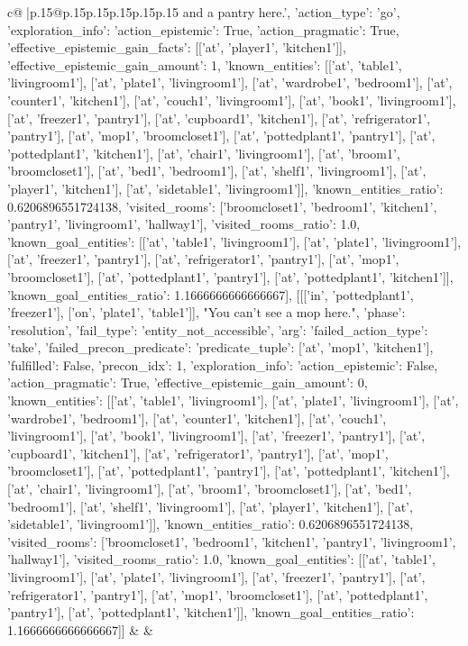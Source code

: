 \documentclass{article}
\begin{document}
{\begin{supertabular}{c@{$\;$}|p{.15\linewidth}@{}p{.15\linewidth}p{.15\linewidth}p{.15\linewidth}p{.15\linewidth}p{.15\linewidth}}
{{{and a pantry here.', {'action_type': 'go', 'exploration_info': {'action_epistemic': True, 'action_pragmatic': True, 'effective_epistemic_gain_facts': [['at', 'player1', 'kitchen1']], 'effective_epistemic_gain_amount': 1, 'known_entities': [['at', 'table1', 'livingroom1'], ['at', 'plate1', 'livingroom1'], ['at', 'wardrobe1', 'bedroom1'], ['at', 'counter1', 'kitchen1'], ['at', 'couch1', 'livingroom1'], ['at', 'book1', 'livingroom1'], ['at', 'freezer1', 'pantry1'], ['at', 'cupboard1', 'kitchen1'], ['at', 'refrigerator1', 'pantry1'], ['at', 'mop1', 'broomcloset1'], ['at', 'pottedplant1', 'pantry1'], ['at', 'pottedplant1', 'kitchen1'], ['at', 'chair1', 'livingroom1'], ['at', 'broom1', 'broomcloset1'], ['at', 'bed1', 'bedroom1'], ['at', 'shelf1', 'livingroom1'], ['at', 'player1', 'kitchen1'], ['at', 'sidetable1', 'livingroom1']], 'known_entities_ratio': 0.6206896551724138, 'visited_rooms': ['broomcloset1', 'bedroom1', 'kitchen1', 'pantry1', 'livingroom1', 'hallway1'], 'visited_rooms_ratio': 1.0, 'known_goal_entities': [['at', 'table1', 'livingroom1'], ['at', 'plate1', 'livingroom1'], ['at', 'freezer1', 'pantry1'], ['at', 'refrigerator1', 'pantry1'], ['at', 'mop1', 'broomcloset1'], ['at', 'pottedplant1', 'pantry1'], ['at', 'pottedplant1', 'kitchen1']], 'known_goal_entities_ratio': 1.1666666666666667}}], [[['in', 'pottedplant1', 'freezer1'], ['on', 'plate1', 'table1']], "You can't see a mop here.", {'phase': 'resolution', 'fail_type': 'entity_not_accessible', 'arg': {'failed_action_type': 'take', 'failed_precon_predicate': {'predicate_tuple': ['at', 'mop1', 'kitchen1'], 'fulfilled': False, 'precon_idx': 1}}, 'exploration_info': {'action_epistemic': False, 'action_pragmatic': True, 'effective_epistemic_gain_amount': 0, 'known_entities': [['at', 'table1', 'livingroom1'], ['at', 'plate1', 'livingroom1'], ['at', 'wardrobe1', 'bedroom1'], ['at', 'counter1', 'kitchen1'], ['at', 'couch1', 'livingroom1'], ['at', 'book1', 'livingroom1'], ['at', 'freezer1', 'pantry1'], ['at', 'cupboard1', 'kitchen1'], ['at', 'refrigerator1', 'pantry1'], ['at', 'mop1', 'broomcloset1'], ['at', 'pottedplant1', 'pantry1'], ['at', 'pottedplant1', 'kitchen1'], ['at', 'chair1', 'livingroom1'], ['at', 'broom1', 'broomcloset1'], ['at', 'bed1', 'bedroom1'], ['at', 'shelf1', 'livingroom1'], ['at', 'player1', 'kitchen1'], ['at', 'sidetable1', 'livingroom1']], 'known_entities_ratio': 0.6206896551724138, 'visited_rooms': ['broomcloset1', 'bedroom1', 'kitchen1', 'pantry1', 'livingroom1', 'hallway1'], 'visited_rooms_ratio': 1.0, 'known_goal_entities': [['at', 'table1', 'livingroom1'], ['at', 'plate1', 'livingroom1'], ['at', 'freezer1', 'pantry1'], ['at', 'refrigerator1', 'pantry1'], ['at', 'mop1', 'broomcloset1'], ['at', 'pottedplant1', 'pantry1'], ['at', 'pottedplant1', 'kitchen1']], 'known_goal_entities_ratio': 1.1666666666666667}}]] 
	  } 
	   } 
	   } 
	 & & \\ 
 


\end{supertabular}}
\end{document}
